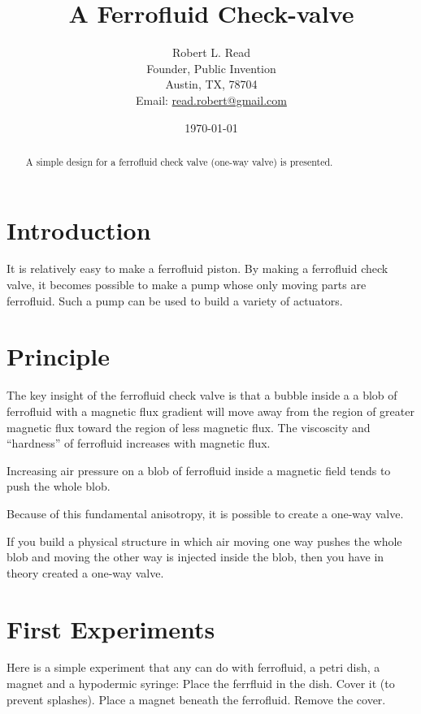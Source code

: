 \documentclass{article}
\title{A Ferrofluid Check-valve}
\author{Robert L. Read \\
    Founder, Public Invention \\
    Austin, TX, 78704 \\
    Email: \href{mailto:read.robert@gmail.com}{read.robert@gmail.com} 
}
\date{\today}
\begin{document}
\maketitle

\begin{abstract}
  A simple design for a ferrofluid check valve (one-way valve) is
  presented.
\end{abstract}


\section{Introduction}

It is relatively easy to make a ferrofluid piston. By making
a ferrofluid check valve, it becomes possible to make a pump
whose only moving parts are ferrofluid.  Such a pump can
be used to build a variety of actuators.

\section{Principle}

The key insight of the ferrofluid check valve is that a bubble inside a
a blob of ferrofluid with a magnetic flux gradient will move away from
the region of greater magnetic flux toward the region of less magnetic
flux. The viscoscity and ``hardness'' of ferrofluid increases
with magnetic flux.

Increasing air pressure on a blob of ferrofluid inside a magnetic
field tends to push the whole blob.

Because of this fundamental anisotropy, it is possible to
create a one-way valve.

If you build a physical structure in which air moving one way
pushes the whole blob and moving the other way is injected inside
the blob, then you have in theory created a one-way valve.


\section{First Experiments}

Here is a simple experiment that any can do with ferrofluid, a petri dish, a magnet and a hypodermic syringe:
Place the ferrfluid in the dish. Cover it (to prevent splashes). Place a magnet beneath the ferrofluid.
Remove the cover.
\end{document}

